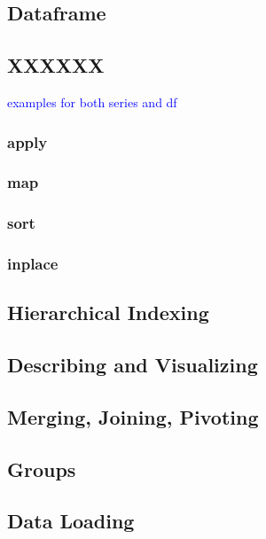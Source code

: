 \textcolor{blue}{}
\textcolor{blue}{}


\subsection{Dataframe}

\subsection{XXXXXX}

\textcolor{blue}{examples for both series and df}

\subsubsection{apply}



\subsubsection{map}



\subsubsection{sort}



\subsubsection{inplace}



\subsection{Hierarchical Indexing}

\subsection{Describing and Visualizing}

\subsection{Merging, Joining, Pivoting}

\subsection{Groups}

\subsection{Data Loading}

